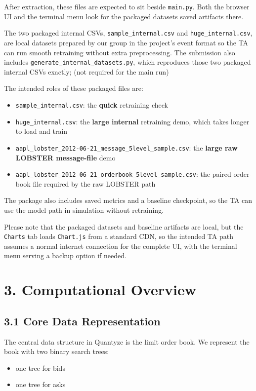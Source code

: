 \documentclass[11pt]{article}
\begin{document}
After extraction, these files are expected to sit beside \texttt{main.py}. Both
the browser UI and the terminal menu look for the packaged datasets saved artifacts there.

The two packaged internal CSVs, \texttt{sample\_internal.csv} and
\texttt{huge\_internal.csv}, are local datasets prepared by our group in the
project's event format so the TA can run smooth
retraining without extra preprocessing.
The submission also includes \texttt{generate\_internal\_datasets.py}, which
reproduces those two packaged internal CSVs exactly; (not required for the main run)

The intended roles of these packaged files are:
\begin{itemize}
    \item \texttt{sample\_internal.csv}: the \textbf{quick} retraining check
    \item \texttt{huge\_internal.csv}: the \textbf{large internal} retraining
    demo, which takes longer to load and train
    \item \texttt{aapl\_lobster\_2012-06-21\_message\_5level\_sample.csv}: the
    \textbf{large raw LOBSTER message-file} demo
    \item \texttt{aapl\_lobster\_2012-06-21\_orderbook\_5level\_sample.csv}:
    the paired order-book file required by the raw LOBSTER path
\end{itemize}

The package also includes saved metrics and a baseline checkpoint, so the TA
can use the model path in simulation without retraining.

Please note that the packaged datasets and baseline artifacts are local, but the
\texttt{Charts} tab loads \texttt{Chart.js} from a standard CDN, so the
intended TA path assumes a normal internet connection for the complete UI, with the terminal menu serving a backup option if needed.

\section*{3. Computational Overview}
\subsection*{3.1 Core Data Representation}
The central data structure in Quantyze is the limit order book. We represent the
book with two binary search trees:
\begin{itemize}
    \item one tree for bids
    \item one tree for asks
\end{itemize}
\end{document}

